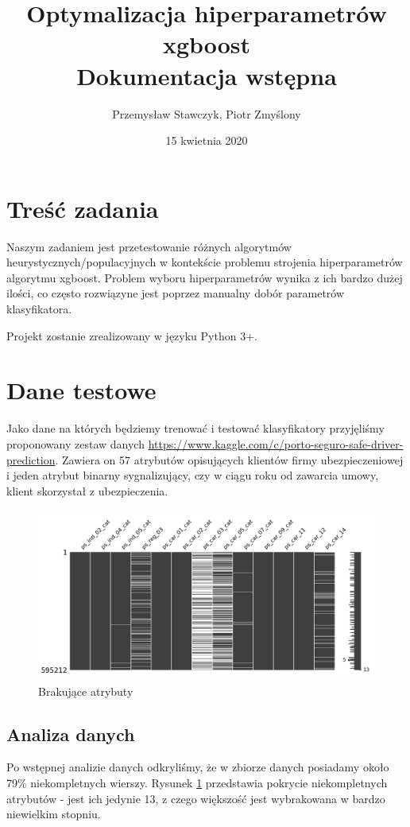 \documentclass[11pt]{article}
\title{Optymalizacja hiperparametrów xgboost\\
	\large Dokumentacja wstępna}
\author{Przemysław Stawczyk, Piotr Zmyślony}
\date{15 kwietnia 2020} %
\begin{document}
	\maketitle
	\setcounter{secnumdepth}{3}
	\setcounter{tocdepth}{3}
	\tableofcontents
	\clearpage

\section{Treść zadania}
Naszym zadaniem jest przetestowanie różnych algorytmów heurystycznych/populacyjnych w kontekście problemu strojenia hiperparametrów algorytmu xgboost. Problem wyboru hiperparametrów wynika z ich bardzo dużej ilości, co często rozwiązyne jest poprzez manualny dobór parametrów klasyfikatora.

Projekt zostanie zrealizowany w języku Python 3+.
\section{Dane testowe}
Jako dane na których będziemy trenować i testować klasyfikatory przyjęliśmy proponowany zestaw danych \url{https://www.kaggle.com/c/porto-seguro-safe-driver-prediction}. Zawiera on 57 atrybutów opisujących klientów firmy ubezpieczeniowej i jeden atrybut binarny sygnalizujący, czy w ciągu roku od zawarcia umowy, klient skorzystał z ubezpieczenia.

\begin{figure}[H]
	\caption{Brakujące atrybuty}
	\label{attrib_analysis}
	\centering
	\includegraphics[width=\textwidth]{attrib_analysis}
\end{figure}

\subsection{Analiza danych}
Po wstępnej analizie danych odkryliśmy, że w zbiorze danych posiadamy około 79\% niekompletnych wierszy. Rysunek \ref{attrib_analysis} przedstawia pokrycie niekompletnych atrybutów - jest ich jedynie 13, z czego większość jest wybrakowana w bardzo niewielkim stopniu.
\end{document}
